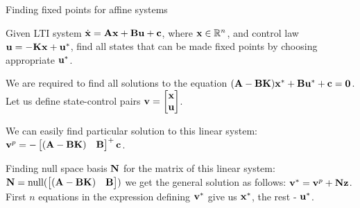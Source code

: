 \documentclass{beamer}
\begin{document}
\begin{frame}{Finding fixed points for affine systems}
\begin{flushleft}

Given LTI system $\dot{\mathbf{x}} = \mathbf{A} \mathbf{x} + \mathbf{B} \mathbf{u} + \mathbf{c}$, where $\mathbf{x} \in \mathbb{R}^n$, and control law $\mathbf{u} = -\mathbf{K}\mathbf{x} + \mathbf{u}^*$, find all states that can be made fixed points by choosing appropriate $\mathbf{u}^*$.

\bigskip

We are required to find all solutions to the equation $(\mathbf{A} - \mathbf{B}\mathbf{K})\mathbf{x}^* + \mathbf{B}\mathbf{u}^* + \mathbf{c} = \mathbf{0}$. Let us define state-control pairs $\mathbf{v} = \begin{bmatrix} \mathbf{x} \\ \mathbf{u} \end{bmatrix}$. 

\bigskip

We can easily find particular solution to this linear system: $\mathbf{v}^p = -\begin{bmatrix} (\mathbf{A} - \mathbf{B}\mathbf{K}) & \mathbf{B} \end{bmatrix}^+\mathbf{c}$. 

\bigskip

Finding null space basis $\mathbf{N}$ for the matrix of this linear system: $\mathbf{N} = \text{null}(\begin{bmatrix} (\mathbf{A} - \mathbf{B}\mathbf{K}) & \mathbf{B} \end{bmatrix})$ we get the general solution as follows: $\mathbf{v}^* = \mathbf{v}^p + \mathbf{N}\mathbf{z}$. First $n$ equations in the expression defining $\mathbf{v}^*$ give us $\mathbf{x}^*$, the rest - $\mathbf{u}^*$.

\end{flushleft}
\end{frame}
\end{document}
